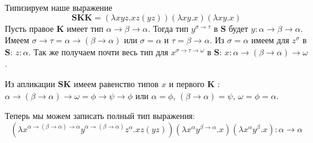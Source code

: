 \documentclass[a4paper,12pt]{article}
\begin{document}
Типизируем наше выражение
\[
    \mathbf{SKK} = 
    (\lambda xyz.xz(yz))(\lambda xy.x)(\lambda xy.x)
\]
Пусть правое $\mathbf{K}$ имеет тип $\alpha \to \beta \to \alpha$. 
Тогда тип $y^{\sigma \to \tau}$ в $\mathbf{S}$ будет $y: \alpha \to \beta \to \alpha$.
Имеем $\sigma \to \tau = \alpha \to (\beta \to \alpha)$ или $\sigma = \alpha$ и 
$\tau = \beta \to \alpha$. Из $\sigma = \alpha$ имеем для $z^{\sigma}$ в $\mathbf{S}$: $z: \alpha$.
Так же получаем почти весь тип для $x^{\sigma \to \tau \to \omega}$ в $\mathbf{S}$:
$x : \alpha \to (\beta \to \alpha) \to \omega$. 

Из апликации $\mathbf{SK}$ имеем равенство типов $x$ и первого $\mathbf{K}$ :
 $\alpha \to (\beta \to \alpha) \to \omega = \phi \to \psi \to \phi$ или
 $\alpha = \phi$, $(\beta \to \alpha) = \psi$, $\omega = \phi = \alpha$.

 Теперь мы можем записать полный тип выражения:
\[
    (\lambda x^{\alpha \to (\beta \to \alpha) \to \alpha}
    y^{\alpha \to (\beta \to \alpha)}
    z^{\alpha} . xz(yz)) 
    (\lambda x^{\alpha}y^{\beta \to \alpha}.x)
    (\lambda x^{\alpha}y^{\beta}.x) : \alpha \to \alpha
\]
\end{document}
